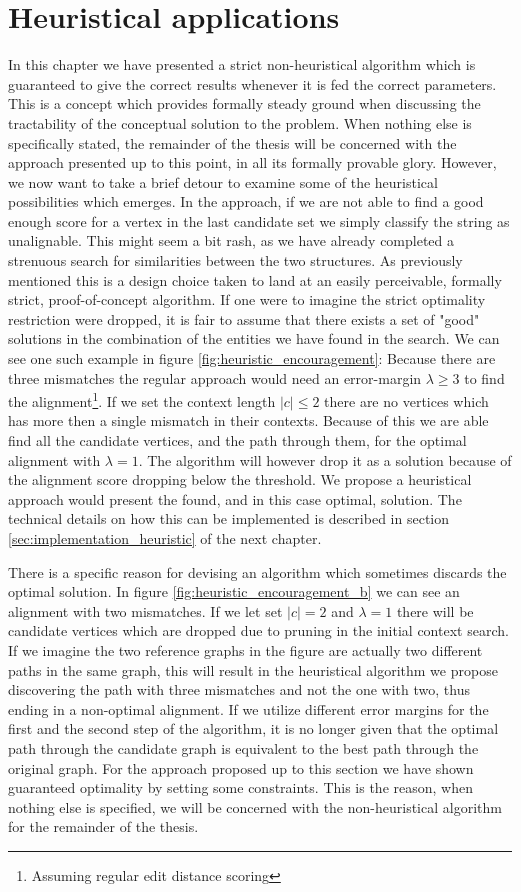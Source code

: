 \documentclass[thesis.tex]{subfiles}
\begin{document}
\section{Heuristical applications}
\label{sec:heuristical_conceptual}
In this chapter we have presented a strict non-heuristical algorithm which is guaranteed to give the correct results whenever it is fed the correct parameters. This is a concept which provides formally steady ground when discussing the tractability of the conceptual solution to the problem. When nothing else is specifically stated, the remainder of the thesis will be concerned with the approach presented up to this point, in all its formally provable glory. However, we now want to take a brief detour to examine some of the heuristical possibilities which emerges. In the approach, if we are not able to find a good enough score for a vertex in the last candidate set we simply classify the string as unalignable. This might seem a bit rash, as we have already completed a strenuous search for similarities between the two structures. As previously mentioned this is a design choice taken to land at an easily perceivable, formally strict, proof-of-concept algorithm. If one were to imagine the strict optimality restriction were dropped, it is fair to assume that there exists a set of "good" solutions in the combination of the entities we have found in the search. We can see one such example in figure \ref{fig:heuristic_encouragement}: Because there are three mismatches the regular approach would need an error-margin $\lambda\geq3$ to find the alignment\footnote{Assuming regular edit distance scoring}. If we set the context length $|c|\leq2$ there are no vertices which has more then a single mismatch in their contexts. Because of this we are able find all the candidate vertices, and the path through them, for the optimal alignment with $\lambda=1$. The algorithm will however drop it as a solution because of the alignment score dropping below the threshold. We propose a heuristical approach would present the found, and in this case optimal, solution. The technical details on how this can be implemented is described in section \ref{sec:implementation_heuristic} of the next chapter.\\
\par\noindent
There is a specific reason for devising an algorithm which sometimes discards the optimal solution. In figure \ref{fig:heuristic_encouragement_b} we can see an alignment with two mismatches. If we let set $|c|=2$ and $\lambda=1$ there will be candidate vertices which are dropped due to pruning in the initial context search. If we imagine the two reference graphs in the figure are actually two different paths in the same graph, this will result in the heuristical algorithm we propose discovering the path with three mismatches and not the one with two, thus ending in a non-optimal alignment. If we utilize different error margins for the first and the second step of the algorithm, it is no longer given that the optimal path through the candidate graph is equivalent to the best path through the original graph. For the approach proposed up to this section we have shown guaranteed optimality by setting some constraints. This is the reason, when nothing else is specified, we will be concerned with the non-heuristical algorithm for the remainder of the thesis.
\end{document}
